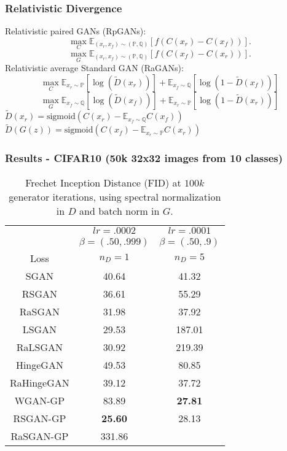 \documentclass[t]{beamer}
\begin{document}
\begin{frame}
\frametitle{Relativistic Divergence}
Relativistic paired GANs (RpGANs):
\begin{equation}
\max_C \mathbb{E}_{(x_r,x_f) \sim (\mathbb{P},\mathbb{Q})}\left[f(C(x_r)-C(x_f)) \right].
\end{equation}
\begin{equation}
\max_G \mathbb{E}_{(x_r,x_f) \sim (\mathbb{P},\mathbb{Q})}\left[f(C(x_f)-C(x_r)) \right].
\end{equation}
Relativistic average Standard GAN (RaGANs):
\begin{equation}
\max_C \mathbb{E}_{x_r \sim \mathbb{P}}\left[ \log\left( \tilde{D}(x_r) \right) \right] + \mathbb{E}_{x_f \sim \mathbb{Q}} \left[ \log \left( 1 - \tilde{D}(x_f) \right) \right]
\end{equation} 
\begin{equation}
\max_G \mathbb{E}_{x_f \sim \mathbb{Q}}\left[ \log\left( \tilde{D}(x_f) \right) \right] + \mathbb{E}_{x_r \sim \mathbb{P}} \left[ \log \left( 1 - \tilde{D}(x_r) \right) \right]
\end{equation}
$\tilde{D}(x_r)=\text{sigmoid} \left( C(x_r)-\mathbb{E}_{x_f \sim \mathbb{Q}} C(x_f) \right)$ \\ $ \tilde{D}(G(z))=\text{sigmoid} \left( C(x_f)-\mathbb{E}_{x_r \sim \mathbb{P}} C(x_r) \right)$

\end{frame}


\begin{frame}
	\frametitle{Results - CIFAR10 (50k 32x32 images from 10 classes)}

{\small \begin{table}
	\caption{Frechet Inception Distance (FID) at $100k$ generator iterations, using spectral normalization in $D$ and batch norm in $G$.}
	\label{CIFAR10}
	\centering
	\begin{tabular}{ccc}
		\toprule
		& $lr=.0002$ & $lr=.0001$ \\
		& $\beta=(.50,.999)$ & $\beta=(.50,.9)$ \\
		Loss & $n_D=1$ & $n_D=5$ \\
		\cmidrule(){1-3}
		SGAN & 40.64 & 41.32 \\
		RSGAN & 36.61 & 55.29 \\
		RaSGAN & 31.98 &  37.92  \\
		\cmidrule(){1-3}
		LSGAN &  29.53 & 187.01 \\
		RaLSGAN &  30.92 & 219.39 \\
		\cmidrule(){1-3}
		HingeGAN & 49.53 & 80.85 \\
		RaHingeGAN & 39.12 &  37.72 \\
		\cmidrule(){1-3}
		WGAN-GP & 83.89 & \textbf{27.81} \\
		RSGAN-GP & \textbf{25.60} &  28.13 \\
		RaSGAN-GP & 331.86 &  \\
		\bottomrule
	\end{tabular}
\end{table}}

\end{frame}
\end{document}
